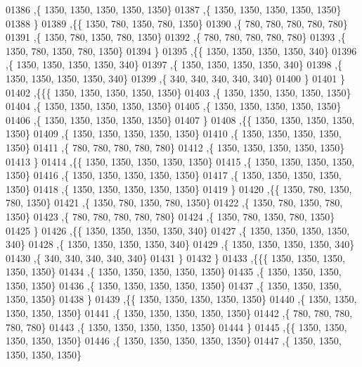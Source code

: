 \begin{DoxyCode}
01386    ,\{  1350,  1350,  1350,  1350,  1350\}
01387    ,\{  1350,  1350,  1350,  1350,  1350\}
01388    \}
01389   ,\{\{  1350,   780,  1350,   780,  1350\}
01390    ,\{   780,   780,   780,   780,   780\}
01391    ,\{  1350,   780,  1350,   780,  1350\}
01392    ,\{   780,   780,   780,   780,   780\}
01393    ,\{  1350,   780,  1350,   780,  1350\}
01394    \}
01395   ,\{\{  1350,  1350,  1350,  1350,   340\}
01396    ,\{  1350,  1350,  1350,  1350,   340\}
01397    ,\{  1350,  1350,  1350,  1350,   340\}
01398    ,\{  1350,  1350,  1350,  1350,   340\}
01399    ,\{   340,   340,   340,   340,   340\}
01400    \}
01401   \}
01402  ,\{\{\{  1350,  1350,  1350,  1350,  1350\}
01403    ,\{  1350,  1350,  1350,  1350,  1350\}
01404    ,\{  1350,  1350,  1350,  1350,  1350\}
01405    ,\{  1350,  1350,  1350,  1350,  1350\}
01406    ,\{  1350,  1350,  1350,  1350,  1350\}
01407    \}
01408   ,\{\{  1350,  1350,  1350,  1350,  1350\}
01409    ,\{  1350,  1350,  1350,  1350,  1350\}
01410    ,\{  1350,  1350,  1350,  1350,  1350\}
01411    ,\{   780,   780,   780,   780,   780\}
01412    ,\{  1350,  1350,  1350,  1350,  1350\}
01413    \}
01414   ,\{\{  1350,  1350,  1350,  1350,  1350\}
01415    ,\{  1350,  1350,  1350,  1350,  1350\}
01416    ,\{  1350,  1350,  1350,  1350,  1350\}
01417    ,\{  1350,  1350,  1350,  1350,  1350\}
01418    ,\{  1350,  1350,  1350,  1350,  1350\}
01419    \}
01420   ,\{\{  1350,   780,  1350,   780,  1350\}
01421    ,\{  1350,   780,  1350,   780,  1350\}
01422    ,\{  1350,   780,  1350,   780,  1350\}
01423    ,\{   780,   780,   780,   780,   780\}
01424    ,\{  1350,   780,  1350,   780,  1350\}
01425    \}
01426   ,\{\{  1350,  1350,  1350,  1350,   340\}
01427    ,\{  1350,  1350,  1350,  1350,   340\}
01428    ,\{  1350,  1350,  1350,  1350,   340\}
01429    ,\{  1350,  1350,  1350,  1350,   340\}
01430    ,\{   340,   340,   340,   340,   340\}
01431    \}
01432   \}
01433  ,\{\{\{  1350,  1350,  1350,  1350,  1350\}
01434    ,\{  1350,  1350,  1350,  1350,  1350\}
01435    ,\{  1350,  1350,  1350,  1350,  1350\}
01436    ,\{  1350,  1350,  1350,  1350,  1350\}
01437    ,\{  1350,  1350,  1350,  1350,  1350\}
01438    \}
01439   ,\{\{  1350,  1350,  1350,  1350,  1350\}
01440    ,\{  1350,  1350,  1350,  1350,  1350\}
01441    ,\{  1350,  1350,  1350,  1350,  1350\}
01442    ,\{   780,   780,   780,   780,   780\}
01443    ,\{  1350,  1350,  1350,  1350,  1350\}
01444    \}
01445   ,\{\{  1350,  1350,  1350,  1350,  1350\}
01446    ,\{  1350,  1350,  1350,  1350,  1350\}
01447    ,\{  1350,  1350,  1350,  1350,  1350\}

\end{DoxyCode}
